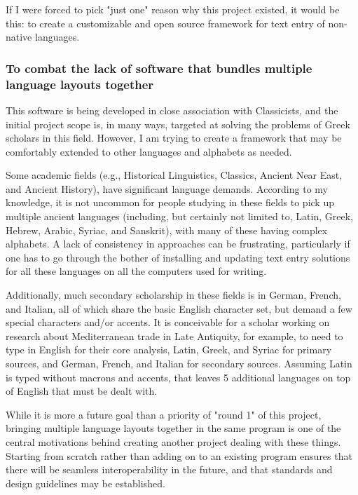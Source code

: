 \documentclass[11pt]{article}
\begin{document}
\begin{enumerate}
If I were forced to pick "just one" reason why this project existed, it would be this: to create a customizable and open source framework for text entry of non-native languages.
\end{enumerate}

\subsubsection{To combat the lack of software that bundles multiple language layouts together}
\label{sec:orge86ec60}

This software is being developed in close association with Classicists, and the initial project scope is, in many ways, targeted at solving the problems of Greek scholars in this field. However, I am trying to create a framework that may be comfortably extended to other languages and alphabets as needed.

Some academic fields (e.g., Historical Linguistics, Classics, Ancient Near East, and Ancient History), have significant language demands. According to my knowledge, it is not uncommon for people studying in these fields to pick up multiple ancient languages (including, but certainly not limited to, Latin, Greek, Hebrew, Arabic, Syriac, and Sanskrit), with many of these having complex alphabets. A lack of consistency in approaches can be frustrating, particularly if one has to go through the bother of installing and updating text entry solutions for all these languages on all the computers used for writing.

Additionally, much secondary scholarship in these fields is in German, French, and Italian, all of which share the basic English character set, but demand a few special characters and/or accents. It is conceivable for a scholar working on research about Mediterranean trade in Late Antiquity, for example, to need to type in English for their core analysis, Latin, Greek, and Syriac for primary sources, and German, French, and Italian for secondary sources. Assuming Latin is typed without macrons and accents, that leaves 5 additional languages on top of English that must be dealt with.

While it is more a future goal than a priority of "round 1" of this project, bringing multiple language layouts together in the same program is one of the central motivations behind creating another project dealing with these things. Starting from scratch rather than adding on to an existing program ensures that there will be seamless interoperability in the future, and that standards and design guidelines may be established.
\end{document}
